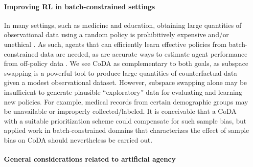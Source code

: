 \documentclass{article}
\begin{document}
\paragraph{Improving RL in batch-constrained settings}
In many settings, such as medicine and education, obtaining large quantities of observational data using a random policy is prohibitively expensive and/or unethical \cite{thomas2016data,munos2016safe}.
As such, agents that can efficiently learn effective policies from batch-constrained data are needed, as are accurate ways to estimate agent performance from off-policy data \cite{mandel2014offline,oberst2019counterfactual,raghu2018behaviour}.
We see CoDA as complementary to both goals, as subspace swapping is a powerful tool to produce large quantities of counterfactual data given a modest observational dataset.
However, subspace swapping alone may be insufficient to generate plausible ``exploratory'' data for evaluating and learning new policies.
For example, medical records from certain demographic groups may be unavailable or improperly collected/labeled.
It is conceivable that a CoDA with a suitable prioritization scheme could compensate for such sample bias, but applied work in batch-constrained domains that characterizes the effect of sample bias on CoDA should nevertheless be carried out.

\paragraph{General considerations related to artificial agency} 
\end{document}
